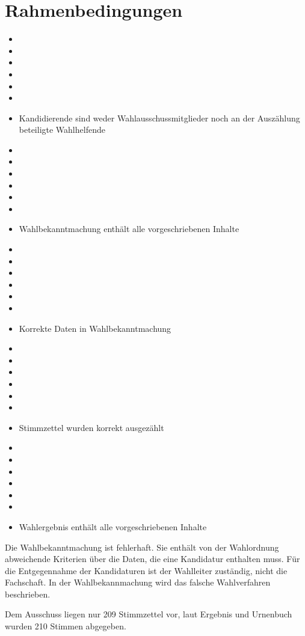 \documentclass[a4paper]{scrartcl}
\newcommand{\fullcheck}{\raisebox{-.8\dp\strutbox}{\texttt{[image: Check.pdf]}}}
\newcommand{\semicheck}{\raisebox{-.8\dp\strutbox}{\texttt{[image: Semicheck.pdf]}}}
\newcommand{\nocheck}{\raisebox{-.8\dp\strutbox}{\texttt{[image: Nocheck.pdf]}}}
\newcommand{\dontknow}{\raisebox{-.8\dp\strutbox}{\texttt{[image: Dontknow.pdf]}}}
\newcommand{\notrev}{\raisebox{-.8\dp\strutbox}{\texttt{[image: Notrev.pdf]}}}
\newcommand{\sym}[1]{
\ifcase#1 \item[$\Box$]
\or \item[\fullcheck]
\or \item[\semicheck]
\or \item[\nocheck]
\or \item[\dontknow]
\or \item[\notrev]
\else \item[$\Box$]
\fi}
\begin{document}

\section{Rahmenbedingungen}
\begin{itemize}[label=$\Box$]

\sym{1} Kandidierende sind weder Wahlausschussmitglieder noch an der Auszählung beteiligte Wahlhelfende
\sym{3} Wahlbekanntmachung enthält alle vorgeschriebenen Inhalte
\sym{1} Korrekte Daten in Wahlbekanntmachung
\sym{4} Stimmzettel wurden korrekt ausgezählt
\sym{3} Wahlergebnis enthält alle vorgeschriebenen Inhalte
\end{itemize}



Die Wahlbekanntmachung ist fehlerhaft.
Sie enthält von der Wahlordnung abweichende Kriterien über die Daten, die eine Kandidatur enthalten muss.
Für die Entgegennahme der Kandidaturen ist der Wahlleiter zuständig, nicht die Fachschaft.
In der Wahlbekannmachung wird das falsche Wahlverfahren beschrieben.

Dem Ausschuss liegen nur 209 Stimmzettel vor, laut Ergebnis und Urnenbuch wurden 210 Stimmen abgegeben.







\end{document}
